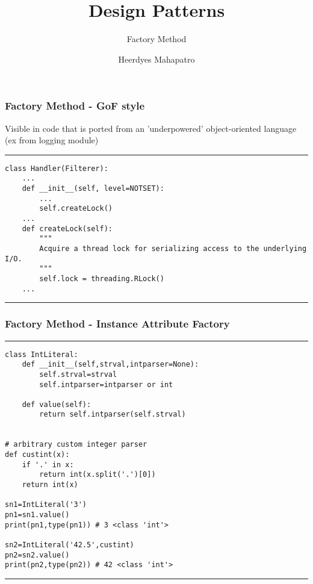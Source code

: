 \documentclass{beamer}
\title{Design Patterns}
\subtitle{Factory Method}
\author{Heerdyes Mahapatro}
\begin{document}
	\frame {
		\titlepage
	}
	\begin{frame}[fragile]
	    \frametitle{Factory Method - GoF style}
	    Visible in code that is ported from an 'underpowered' object-oriented language (ex from logging module)
	    \rule{\textwidth}{1pt}
	    \scriptsize
	    \begin{verbatim}
class Handler(Filterer):
    ...
    def __init__(self, level=NOTSET):
        ...
        self.createLock()
    ...
    def createLock(self):
        """
        Acquire a thread lock for serializing access to the underlying I/O.
        """
        self.lock = threading.RLock()
    ...
	    \end{verbatim}
	    \rule{\textwidth}{1pt}
	\end{frame}
	\begin{frame}[fragile]
	    \frametitle{Factory Method - Instance Attribute Factory}
	    \rule{\textwidth}{1pt}
	    \scriptsize
	    \begin{verbatim}
class IntLiteral:
    def __init__(self,strval,intparser=None):
        self.strval=strval
        self.intparser=intparser or int
        
    def value(self):
        return self.intparser(self.strval)


# arbitrary custom integer parser
def custint(x):
    if '.' in x:
        return int(x.split('.')[0])
    return int(x)

sn1=IntLiteral('3')
pn1=sn1.value()
print(pn1,type(pn1)) # 3 <class 'int'>

sn2=IntLiteral('42.5',custint)
pn2=sn2.value()
print(pn2,type(pn2)) # 42 <class 'int'>
	    \end{verbatim}
	    \rule{\textwidth}{1pt}
	\end{frame}
\end{document}

